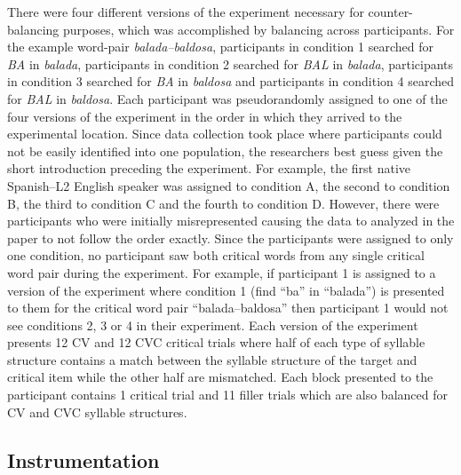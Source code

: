 There were four different versions of the experiment necessary for counter-balancing purposes, which was accomplished by balancing across participants. For the example word-pair \emph{balada–baldosa}, participants in condition 1 searched for \emph{BA} in \emph{balada}, participants in condition 2 searched for \emph{BAL} in \emph{balada}, participants in condition 3 searched for \emph{BA} in \emph{baldosa} and participants in condition 4 searched for \emph{BAL} in \emph{baldosa}. Each participant was pseudorandomly assigned to one of the four versions of the experiment in the order in which they arrived to the experimental location. Since data collection took place where participants could not be easily identified into one population, the researchers best guess given the short introduction preceding the experiment. For example, the first native Spanish–L2 English speaker was assigned to condition A, the second to condition B, the third to condition C and the fourth to condition D. However, there were participants who were initially misrepresented causing the data to analyzed in the paper to not follow the order exactly. Since the participants were assigned to only one condition, no participant saw both critical words from any single critical word pair during the experiment. %
For example, if participant 1 is assigned to a version of the experiment where condition 1 (find “ba” in “balada”) is presented to them for the critical word pair “balada–baldosa” then participant 1 would not see conditions 2, 3 or 4 in their experiment. Each version of the experiment presents 12 CV and 12 CVC critical trials where half of each type of syllable structure contains a match between the syllable structure of the target and critical item while the other half are mismatched. Each block presented to the participant contains 1 critical trial and 11 filler trials which are also balanced for CV and CVC syllable structures.


\subsection{Instrumentation}


